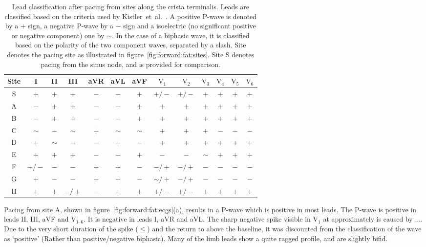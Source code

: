 \begin{table}
\caption[Lead classification from pacing sites through the atria]{
\label{tbl:forward:fat:ecgs}
Lead classification after pacing from sites along the crista terminalis.
Leads are classified based on the criteria used by
Kistler~et~al.~\cite{Kistler2006}.
A positive P-wave is denoted by a $+$ sign, a negative P-wave by a $-$ sign and
a isoelectric (no significant positive or negative component) one by $\sim$.
In the case of a biphasic wave, it is classified based on the polarity of the
two component waves, separated by a slash.
Site denotes the pacing site as illustrated in figure~\ref{fig:forward:fat:sites}.
Site S denotes pacing from the sinus node, and is provided for comparison.
}
\begin{center}
\begin{tabular}{c c c c c c c c c c c c c}
\toprule
Site & I & II & III & aVR & aVL & aVF & $\text{V}_{\text{1}}$ &$\text{V}_{\text{2}}$ & $\text{V}_{\text{3}}$ & $\text{V}_{\text{4}}$ & $\text{V}_{\text{5}}$ & $\text{V}_{\text{6}}$\\
\midrule
S & $+$ & $+$ & $+$ & $-$ & $-$ & $+$ & $+/-$ & $+/-$ & $+$ & $+$ & $+$ & $+$ \\
A & $-$ & $+$ & $+$ & $-$ & $-$ & $+$ & $+$ & $+$ & $+$ & $+$ & $+$ & $+$ \\
B & $-$ & $+$ & $+$ & $-$ & $-$ & $+$ & $+$ & $+$ & $+$ & $+$ & $+$ & $+$ \\
C & $\sim$ & $-$ & $\sim$ & $+$ & $\sim$ & $\sim$ & $+$ & $+$ & $+$ & $-$ & $-$ & $-$ \\
D & $+$ & $\sim$ & $-$ & $-$ & $+$ & $-$ & $+$ & $+$ & $+$ & $+$ & $+$ & $+$ \\
E & $+$ & $+$ & $+$ & $-$ & $-$ & $+$ & $-$ & $-$ & $\sim$ & $+$ & $+$ & $+$ \\
F & $+/-$ & $-$ & $-$ & $+$ & $+$ & $-$ & $-/+$ & $-/+$ & $-$ & $-$ & $-$ & $-$ \\
G & $+$ & $-$ & $-$ & $+$ & $+$ & $-$ & $\sim/+$ & $-/+$ & $-$ & $-$ & $-$ & $-$ \\
H & $+$ & $+$ & $-/+$ & $-$ & $+$ & $+$ & $+/-$ & $+/-$ & $+$ & $+$ & $+$ & $+$ \\
\bottomrule
\end{tabular}
\end{center}
\end{table}

Pacing from site A, shown in figure~\ref{fig:forward:fat:ecgs}(a), results in a
P-wave which is positive in most leads.
The P-wave is positive in leads II, III, aVF and $\text{V}_{\text{1--6}}$.
It is negative in leads I, aVR and aVL.
The sharp negative spike visible in $\text{V}_{\text{1}}$ at approximately
 is caused by ....
Due to the very short duration of the spike ($\leq$) and the return to
above the baseline, it was discounted from the classification of the wave as
`positive' (Rather than positive/negative biphasic).
Many of the limb leads show a quite ragged profile, and are slightly bifid.


